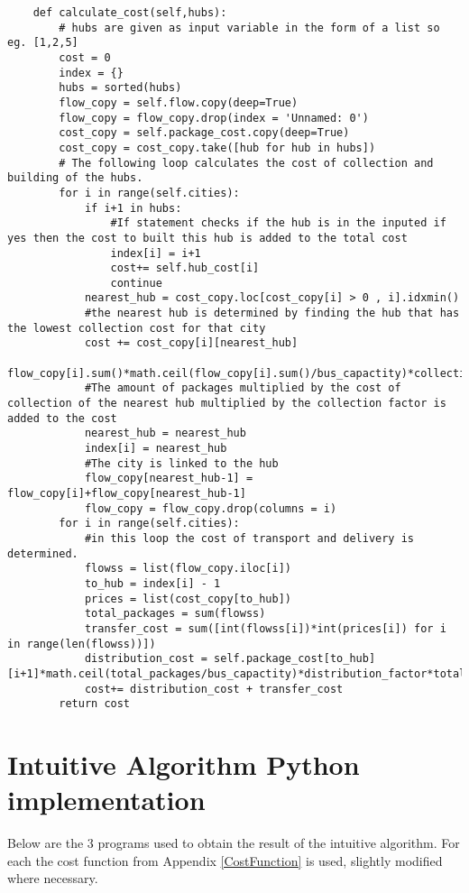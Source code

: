 \documentclass{article}
\begin{document}
\begin{verbatim}
    def calculate_cost(self,hubs):
		# hubs are given as input variable in the form of a list so eg. [1,2,5]
        cost = 0
        index = {} 
        hubs = sorted(hubs)
        flow_copy = self.flow.copy(deep=True)
        flow_copy = flow_copy.drop(index = 'Unnamed: 0')
        cost_copy = self.package_cost.copy(deep=True)
        cost_copy = cost_copy.take([hub for hub in hubs])
        # The following loop calculates the cost of collection and building of the hubs. 
        for i in range(self.cities):
            if i+1 in hubs:
                #If statement checks if the hub is in the inputed if yes then the cost to built this hub is added to the total cost
                index[i] = i+1
                cost+= self.hub_cost[i]
                continue
            nearest_hub = cost_copy.loc[cost_copy[i] > 0 , i].idxmin()
            #the nearest hub is determined by finding the hub that has the lowest collection cost for that city 
            cost += cost_copy[i][nearest_hub]
            flow_copy[i].sum()*math.ceil(flow_copy[i].sum()/bus_capactity)*collection_factor
            #The amount of packages multiplied by the cost of collection of the nearest hub multiplied by the collection factor is added to the cost 
            nearest_hub = nearest_hub 
            index[i] = nearest_hub
            #The city is linked to the hub 
            flow_copy[nearest_hub-1] = flow_copy[i]+flow_copy[nearest_hub-1]
            flow_copy = flow_copy.drop(columns = i)
        for i in range(self.cities):
            #in this loop the cost of transport and delivery is determined. 
            flowss = list(flow_copy.iloc[i])
            to_hub = index[i] - 1 
            prices = list(cost_copy[to_hub])
            total_packages = sum(flowss)
            transfer_cost = sum([int(flowss[i])*int(prices[i]) for i in range(len(flowss))])
            distribution_cost = self.package_cost[to_hub][i+1]*math.ceil(total_packages/bus_capactity)*distribution_factor*total_packages
            cost+= distribution_cost + transfer_cost
        return cost

\end{verbatim}

\section{Intuitive Algorithm Python implementation}
Below are the 3 programs used to obtain the result of the intuitive algorithm. For each the cost function from Appendix \ref{CostFunction} is used, slightly modified where necessary.
\end{document}
